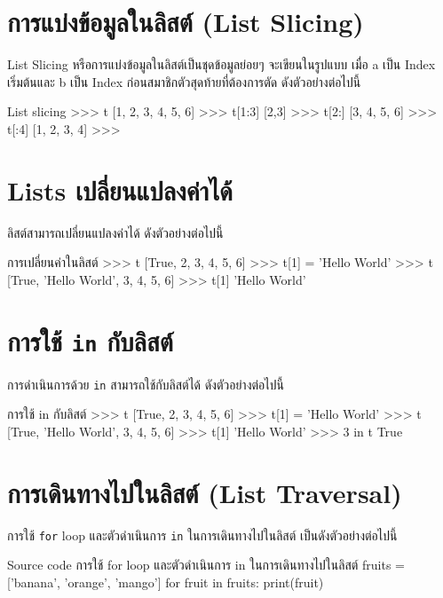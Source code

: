 \section{การแบ่งข้อมูลในลิสต์ (List Slicing)}

List Slicing หรือการแบ่งข้อมูลในลิสต์เป็นชุดข้อมูลย่อยๆ จะเขียนในรูปแบบ  \pyinline{[a:b]} เมื่อ a เป็น Index เริ่มต้นและ b เป็น Index ก่อนสมาชิกตัวสุดท้ายที่ต้องการตัด ดังตัวอย่างต่อไปนี้

\begin{codelist}{List slicing}{}
>>> t
[1, 2, 3, 4, 5, 6]
>>> t[1:3]
[2,3]
>>> t[2:]
[3, 4, 5, 6]
>>> t[:4]
[1, 2, 3, 4]
>>>
\end{codelist}

\section{Lists เปลี่ยนแปลงค่าได้}
ลิสต์สามารถเปลี่ยนแปลงค่าได้  ดังตัวอย่างต่อไปนี้

\begin{codelist}{การเปลี่ยนค่าในลิสต์}{}
>>> t
[True, 2, 3, 4, 5, 6]
>>> t[1] = 'Hello World'
>>> t
[True, 'Hello World', 3, 4, 5, 6]
>>> t[1]
'Hello World'
\end{codelist}


\section{การใช้ \texttt{in} กับลิสต์}

การดำเนินการด้วย \texttt{in}  สามารถใช้กับลิสต์ได้  ดังตัวอย่างต่อไปนี้

\begin{codelist}{การใช้ in กับลิสต์}{}
>>> t
[True, 2, 3, 4, 5, 6]
>>> t[1] = 'Hello World'
>>> t
[True, 'Hello World', 3, 4, 5, 6]
>>> t[1]
'Hello World'
>>> 3 in t
True
\end{codelist}


\section{การเดินทางไปในลิสต์ (List Traversal)}

การใช้ \texttt{for} loop และตัวดำเนินการ \texttt{in} ในการเดินทางไปในลิสต์ เป็นดังตัวอย่างต่อไปนี้


\begin{codelist}{Source code การใช้ for loop และตัวดำเนินการ in ในการเดินทางไปในลิสต์}{}
fruits = ['banana', 'orange', 'mango']
for fruit in fruits: print(fruit)
\end{codelist}

